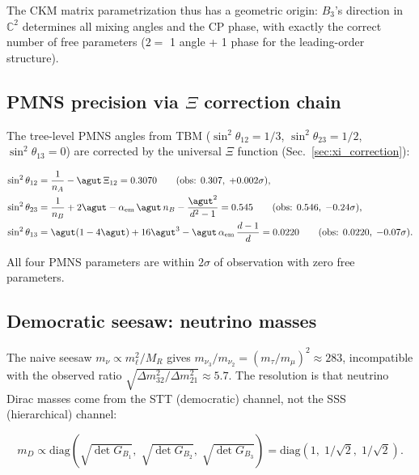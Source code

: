 The CKM matrix parametrization thus has a geometric origin: $B_3$'s direction in $\mathbb{C}^2$ determines all mixing angles and the CP phase, with exactly the correct number of free parameters ($2 = $ 1 angle + 1 phase for the leading-order structure).

\subsection{PMNS precision via $\Xi$ correction chain}
\label{sec:pmns_xi}

The tree-level PMNS angles from TBM ($\sin^2\theta_{12} = 1/3$, $\sin^2\theta_{23} = 1/2$, $\sin^2\theta_{13} = 0$) are corrected by the universal $\Xi$ function (Sec.~\ref{sec:xi_correction}):

\begin{align}
\sin^2\theta_{12} &= \frac{1}{n_A} - \agut\,\Xi_{12} = 0.3070 \qquad(\text{obs: } 0.307,\; +0.002\sigma), \\
\sin^2\theta_{23} &= \frac{1}{n_B} + 2\agut - \alpha_\mathrm{em}\,\agut\,n_B - \frac{\agut^2}{d^2-1} = 0.545 \qquad(\text{obs: } 0.546,\; -0.24\sigma), \\
\sin^2\theta_{13} &= \agut(1 - 4\agut) + 16\agut^3 - \agut\,\alpha_\mathrm{em}\,\frac{d-1}{d} = 0.0220 \qquad(\text{obs: } 0.0220,\; -0.07\sigma).
\end{align}

All four PMNS parameters are within $2\sigma$ of observation with zero free parameters.

\subsection{Democratic seesaw: neutrino masses}
\label{sec:democratic_seesaw}

The naive seesaw $m_\nu \propto m_\ell^2 / M_R$ gives $m_{\nu_3}/m_{\nu_2} = (m_\tau/m_\mu)^2 \approx 283$, incompatible with the observed ratio $\sqrt{\Delta m^2_{32}/\Delta m^2_{21}} \approx 5.7$.  The resolution is that neutrino Dirac masses come from the STT (democratic) channel, not the SSS (hierarchical) channel:

\begin{equation}
m_D \propto \text{diag}(\sqrt{\det G_{B_1}},\; \sqrt{\det G_{B_2}},\; \sqrt{\det G_{B_3}}) = \text{diag}(1,\; 1/\sqrt{2},\; 1/\sqrt{2}).
\end{equation}

